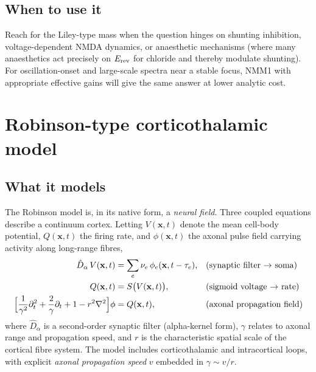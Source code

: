 \documentclass[11pt,a4paper]{article}
\begin{document}
\subsection{When to use it}

Reach for the Liley-type mass when the question hinges on shunting inhibition, voltage-dependent NMDA dynamics, or anaesthetic mechanisms (where many anaesthetics act precisely on $E_{\rm rev}$ for chloride and thereby modulate shunting). For oscillation-onset and large-scale spectra near a stable focus, NMM1 with appropriate effective gains will give the same answer at lower analytic cost.

\section{Robinson-type corticothalamic model}
\label{sec:robinson}

\subsection{What it models}

The Robinson model\cite{Robinson2001,Rennie2002} is, in its native form, a \emph{neural field}. Three coupled equations describe a continuum cortex. Letting $V(\mathbf{x},t)$ denote the mean cell-body potential, $Q(\mathbf{x},t)$ the firing rate, and $\phi(\mathbf{x},t)$ the axonal pulse field carrying activity along long-range fibres,
\begin{align}
\hat D_\alpha\,V(\mathbf{x},t) &= \sum_{e}\nu_e\,\phi_e(\mathbf{x},t-\tau_e),
  &&\text{(synaptic filter $\to$ soma)} \label{eq:robinson_soma}\\
Q(\mathbf{x},t) &= S\bigl(V(\mathbf{x},t)\bigr),
  &&\text{(sigmoid voltage $\to$ rate)} \label{eq:robinson_sigmoid}\\
\Bigl[\frac{1}{\gamma^2}\partial_t^2 + \frac{2}{\gamma}\partial_t + 1 - r^2 \nabla^2\Bigr]\phi &= Q(\mathbf{x},t),
  &&\text{(axonal propagation field)} \label{eq:robinson_field}
\end{align}
where $\hat D_\alpha$ is a second-order synaptic filter (alpha-kernel form), $\gamma$ relates to axonal range and propagation speed, and $r$ is the characteristic spatial scale of the cortical fibre system. The model includes corticothalamic and intracortical loops, with explicit \emph{axonal propagation speed} $v$ embedded in $\gamma\sim v/r$.
\end{document}
